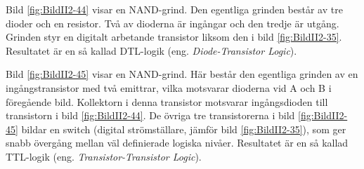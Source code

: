 Bild \ref{fig:BildII2-44} visar en NAND-grind.
Den egentliga grinden består av tre dioder och en resistor.
Två av dioderna är ingångar och den tredje är utgång.
Grinden styr en digitalt arbetande transistor liksom den i bild
\ref{fig:BildII2-35}.
Resultatet är en så kallad DTL-logik (eng. \emph{Diode-Transistor Logic}).


Bild \ref{fig:BildII2-45} visar en NAND-grind.
Här består den egentliga grinden av en ingångstransistor med två emittrar,
vilka motsvarar dioderna vid A och B i föregående bild.
Kollektorn i denna transistor motsvarar ingångsdioden till transistorn i bild
\ref{fig:BildII2-44}.
De övriga tre transistorerna i bild \ref{fig:BildII2-45} bildar en switch (digital strömställare, jämför bild \ref{fig:BildII2-35}),
som ger snabb övergång mellan väl definierade logiska nivåer.
Resultatet är en så kallad TTL-logik (eng. \emph{Transistor-Transistor Logic}).
